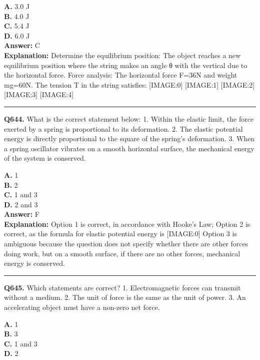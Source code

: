 \documentclass[12pt]{article}
\begin{document}
\textbf{A.} 3.0 J \\
\textbf{B.} 4.0 J \\
\textbf{C.} 5.4 J \\
\textbf{D.} 6.0 J \\

\textbf{Answer:} C \\
\textbf{Explanation:} Determine the equilibrium position: The object reaches a new equilibrium position where the string makes an angle θ with the vertical due to the horizontal force.
Force analysis: The horizontal force F=36N and weight mg=60N. The tension T in the string satisfies:
[IMAGE:0]
[IMAGE:1]
[IMAGE:2]
[IMAGE:3]
[IMAGE:4]

\hrule
\vspace{1em}


\noindent
\textbf{Q644.} What is the correct statement below:
1.
Within the elastic limit, the force exerted by a spring is proportional to its deformation.
2.
The elastic potential energy is directly proportional to the square of the spring's deformation.
3.
When a spring oscillator vibrates on a smooth horizontal surface, the mechanical energy of the system is conserved.



\textbf{A.} 1 \\
\textbf{B.} 2 \\
\textbf{C.} 1 and 3 \\
\textbf{D.} 2 and 3 \\

\textbf{Answer:} F \\
\textbf{Explanation:} Option 1 is correct, in accordance with Hooke's Law; Option 2 is correct, as the formula for elastic potential energy is
[IMAGE:0]
Option 3 is ambiguous because the question does not specify whether there are other forces doing work, but on a smooth surface, if there are no other forces, mechanical energy is conserved.

\hrule
\vspace{1em}


\noindent
\textbf{Q645.} Which statements are correct?
1.
Electromagnetic forces can transmit without a medium.
2.
The unit of force is the same as the unit of power.
3.
An accelerating object must have a non-zero net force.



\textbf{A.} 1 \\
\textbf{B.} 3 \\
\textbf{C.} 1 and 3 \\
\textbf{D.} 2 \\
\end{document}
